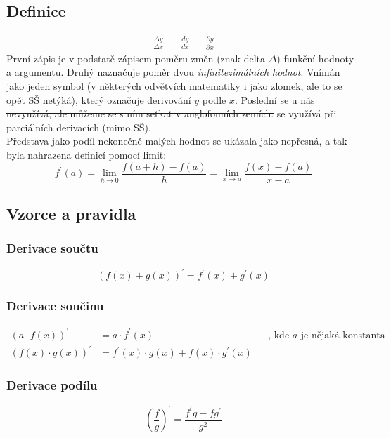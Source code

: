 \documentclass[12pt]{article}
\begin{document}
\subsection{Definice}
\begin{align}
\frac{\Delta y}{\Delta x} && \frac{\,dy}{\,dx} && \frac{\partial y}{\partial x}
\end{align}
První zápis je v podstatě zápisem poměru změn (znak delta $\Delta$) funkční hodnoty a argumentu. Druhý naznačuje poměr dvou \emph{infinitezimálních hodnot}. Vnímán jako jeden symbol (v některých odvětvích matematiky i jako zlomek, ale to se opět SŠ netýká), který označuje derivování $y$ podle $x$. Poslední \st{se u nás nevyužívá, ale můžeme se s ním setkat v anglofonních zemích.} se využívá při parciálních derivacích (mimo SŠ).\\
Představa jako podíl nekonečně malých hodnot se ukázala jako nepřesná, a tak byla nahrazena definicí pomocí limit:
\begin{equation}
f^{\prime}(a) = \lim_{h \to 0} \frac{f(a+h)-f(a)}{h} = \lim_{x \to a} \frac{f(x)-f(a)}{x-a}
\end{equation}

\subsection{Vzorce a pravidla}
\subsubsection{Derivace součtu}
\begin{equation}
(f(x) + g(x))^\prime = f^{\prime}(x) + g^{\prime}(x)
\end{equation}
\subsubsection{Derivace součinu}
\label{sec:der_soucin}
\begin{align}
(a \cdot f(x))^\prime &= a \cdot f^{\prime}(x) && \text{, kde $a$ je nějaká konstanta}\\
(f(x) \cdot g(x))^\prime &= f^{\prime}(x) \cdot g(x) + f(x) \cdot g^{\prime}(x)
\end{align}
\subsubsection{Derivace podílu}
\begin{equation}
\left(\frac{f}{g}\right)^{\prime} = \frac{f^{\prime}g-fg^{\prime}}{g^{2}}
\end{equation}
\end{document}
